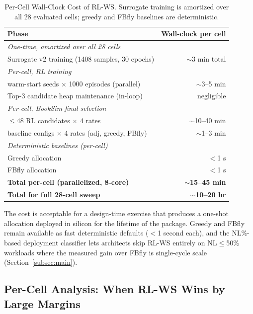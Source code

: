 \documentclass[conference]{IEEEtran}
\begin{document}
\begin{table}[t]
\centering
\caption{Per-Cell Wall-Clock Cost of RL-WS. Surrogate training is amortized over all 28 evaluated cells; greedy and FBfly baselines are deterministic.}
\label{tab:cost}
\footnotesize
\begin{tabular}{lr}
\toprule
Phase & Wall-clock per cell \\
\midrule
\multicolumn{2}{l}{\textit{One-time, amortized over all 28 cells}} \\
\quad Surrogate v2 training (1408 samples, 30 epochs)        & $\sim$3 min total \\
\midrule
\multicolumn{2}{l}{\textit{Per-cell, RL training}} \\
\quad 16 warm-start seeds × 1000 episodes (parallel)         & $\sim$3--5 min \\
\quad Top-3 candidate heap maintenance (in-loop)             & negligible \\
\midrule
\multicolumn{2}{l}{\textit{Per-cell, BookSim final selection}} \\
\quad $\le$48 RL candidates × 4 rates                          & $\sim$10--40 min \\
\quad 3 baseline configs × 4 rates (adj, greedy, FBfly)      & $\sim$1--3 min \\
\midrule
\multicolumn{2}{l}{\textit{Deterministic baselines (per-cell)}} \\
\quad Greedy allocation                                      & $<$1 s \\
\quad FBfly allocation                                       & $<$1 s \\
\midrule
\textbf{Total per-cell (parallelized, 8-core)}                & \textbf{$\sim$15--45 min} \\
\textbf{Total for full 28-cell sweep}                         & \textbf{$\sim$10--20 hr} \\
\bottomrule
\end{tabular}
\end{table}

The cost is acceptable for a design-time exercise that produces a one-shot allocation deployed in silicon for the lifetime of the package. Greedy and FBfly remain available as fast deterministic defaults ($<$1 second each), and the NL\%-based deployment classifier lets architects skip RL-WS entirely on NL$\le$50\% workloads where the measured gain over FBfly is single-cycle scale (Section~\ref{subsec:main}).

\subsection{Per-Cell Analysis: When RL-WS Wins by Large Margins}
\label{subsec:percell}
\end{document}
